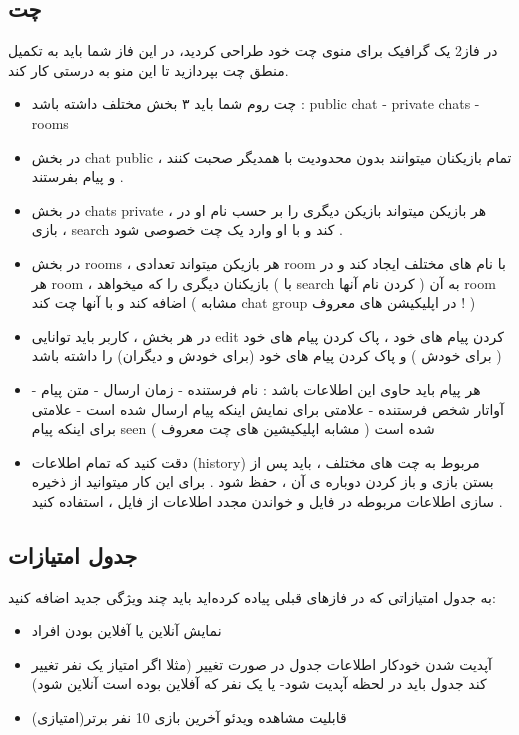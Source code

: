 \documentclass[]{article}
\begin{document}
\subsection*{{\titr چت}}
در فاز2 یک گرافیک برای منوی چت خود طراحی کردید، در این فاز شما باید به تکمیل منطق چت بپردازید تا این منو به درستی کار کند.\\
\begin{itemize}
    \item چت روم شما باید ۳ بخش مختلف داشته باشد : public chat - private chats - rooms
    \item در بخش chat public ، تمام بازیکنان میتوانند بدون محدودیت با همدیگر صحبت کنند و پیام بفرستند .
    \item در بخش chats private ، هر بازیکن میتواند بازیکن دیگری را بر حسب نام او در بازی ، search کند و با او وارد یک چت خصوصی شود .
    \item در بخش rooms ، هر بازیکن میتواند تعدادی room با نام های مختلف ایجاد کند و در هر room ، بازیکنان دیگری را که میخواهد ( با search کردن نام آنها ) به آن room اضافه کند و با آنها چت کند ( مشابه chat group در اپلیکیشن های معروف ! )
    \item در هر بخش ، کاربر باید توانایی edit کردن پیام های خود ، پاک کردن پیام های خود ( برای خودش ) و پاک کردن پیام های خود (برای خودش و دیگران) را داشته باشد
    \item هر پیام باید حاوی این اطلاعات باشد : نام فرستنده - زمان ارسال - متن پیام - آواتار شخص فرستنده - علامتی برای نمایش اینکه پیام ارسال شده است - علامتی برای اینکه پیام seen شده است ( مشابه اپلیکیشین های چت معروف ) 
    \item دقت کنید که تمام اطلاعات (history) مربوط به چت های مختلف ، باید پس از بستن بازی و باز کردن دوباره ی آن ، حفظ شود . برای این کار میتوانید از ذخیره سازی اطلاعات مربوطه در فایل و خواندن مجدد اطلاعات از فایل ، استفاده کنید .

\end{itemize}


\subsection*{{\titr جدول امتیازات}}
به جدول امتیازاتی که در فازهای قبلی پیاده کرده‌اید باید چند ویژگی جدید اضافه کنید:
\begin{itemize}
    \item نمایش آنلاین یا آفلاین بودن افراد
    \item آپدیت شدن خودکار اطلاعات جدول در صورت تغییر (مثلا اگر امتیاز یک نفر تغییر کند جدول باید در لحظه آپدیت شود- یا یک نفر که آفلاین بوده است آنلاین شود)
    \item قابلیت مشاهده ویدئو آخرین بازی 10 نفر برتر(امتیازی)
\end{itemize}
\end{document}

